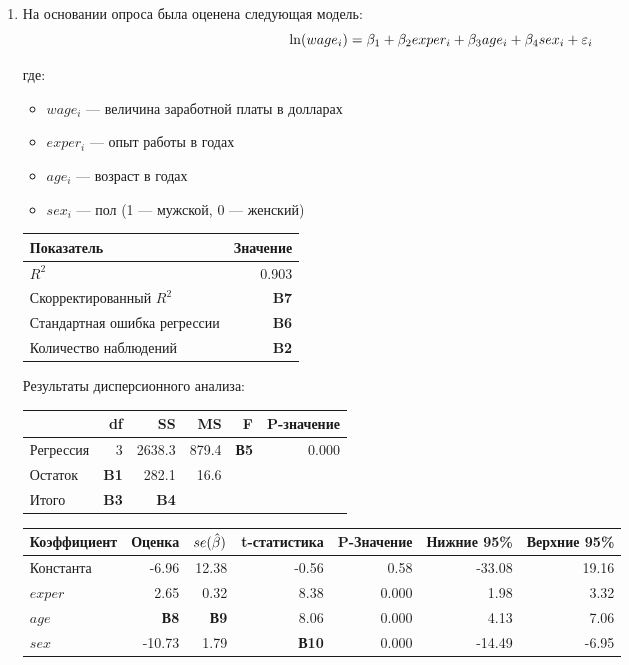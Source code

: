 \documentclass[12pt, a4paper]{article}\usepackage[]{graphicx}\usepackage[]{color}
\begin{document}





\begin{enumerate}


\item На основании опроса была оценена следующая модель:
\[
\ln(wage_i)=\beta_1 + \beta_2 exper_i + \beta_3 age_i + \beta_4 sex_i + \varepsilon_i
\]

где:
\begin{itemize}
\item $wage_i$ — величина заработной платы в долларах
\item $exper_i$ — опыт работы в годах
\item $age_i$ — возраст в годах
\item $sex_i$ — пол (1 — мужской, 0 — женский)
\end{itemize}

\begin{tabular}{lr} \toprule
Показатель & Значение \\
\midrule
$R^2$                        & 0.903 \\
Скорректированный $R^2$      & \textbf{B7} \\
Стандартная ошибка регрессии & \textbf{B6} \\
Количество наблюдений        & \textbf{B2} \\
\bottomrule
\end{tabular}

Результаты дисперсионного анализа:

\begin{tabular}{lrrrrr} \toprule
 & df & SS & MS & F & P-значение \\
\midrule
Регрессия   &  3 & 2638.3  & 879.4 & \textbf{В5} & 0.000 \\
Остаток     & \textbf{B1} & 282.1 & 16.6 &    &       \\
Итого       & \textbf{B3}  & \textbf{B4}     &       &    &       \\
\bottomrule
\end{tabular}


\begin{tabular}{lrrrrrr} \toprule
Коэффициент & Оценка & $se(\hat{\beta})$ & t-статистика & P-Значение & Нижние 95\% & Верхние 95\% \\
\midrule
Константа & -6.96 & 12.38 & -0.56 & 0.58 & -33.08 & 19.16 \\
$exper$ & 2.65 & 0.32 & 8.38 & 0.000 & 1.98 & 3.32 \\
$age$ & \textbf{В8} & \textbf{В9} & 8.06 & 0.000 & 4.13 & 7.06 \\
$sex$ & -10.73 & 1.79 & \textbf{В10} & 0.000 & -14.49 & -6.95 \\
\bottomrule
\end{tabular}


\end{enumerate}
\end{document}
